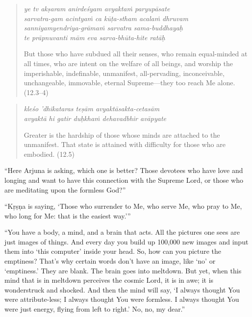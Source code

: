 \documentclass[12pt, twoside, openright]{memoir}
\begin{document}
\par
\begin{verse}
\textit{ye tv akṣaram anirdeśyam avyaktaṁ paryupāsate} \\
\textit{sarvatra-gam acintyaṁ ca kūṭa-stham acalaṁ dhruvam} \\
\textit{sanniyamyendriya-grāmaṁ sarvatra sama-buddhayaḥ} \\
\textit{te prāpnuvanti mām eva sarva-bhūta-hite ratāḥ}

\noindent But those who have subdued all their senses, who remain equal-minded at all times, who are intent on the welfare of all beings, and worship the imperishable, indefinable, unmanifest, all-pervading, inconceivable, unchangeable, immovable, eternal Supreme---they too reach Me alone. (12.3–4)
\end{verse}
\par



\par
\begin{verse}
\textit{kleśo ’dhikataras teṣām avyaktāsakta-cetasām} \\
\textit{avyaktā hi gatir duḥkhaṁ dehavadbhir avāpyate}

\noindent Greater is the hardship of those whose minds are attached to the unmanifest. That state is attained with difficulty for those who are embodied. (12.5)
\end{verse}
\par


\enquote{Here Arjuna is asking, which one is better? Those devotees who have love and longing and want to have this connection with the Supreme Lord, or those who are meditating upon the formless God?}

\enquote{Kṛṣṇa is saying, \enquote{Those who surrender to Me, who serve Me, who pray to Me, who long for Me: that is the easiest way.}}

\enquote{You have a body, a mind, and a brain that acts. All the pictures one sees are just images of things. And every day you build up 100,000 new images and input them into \enquote{this computer} inside your head. So, how can you picture the emptiness? That’s why certain words don’t have an image, like \enquote{no} or \enquote{emptiness.} They are blank. The brain goes into meltdown. But yet, when this mind that is in meltdown perceives the cosmic Lord, it is in awe; it is wonderstruck and shocked. And then the mind will say, \enquote{I always thought You were attribute-less; I always thought You were formless. I always thought You were just energy, flying from left to right.} No, no, my dear.}
\end{document}
